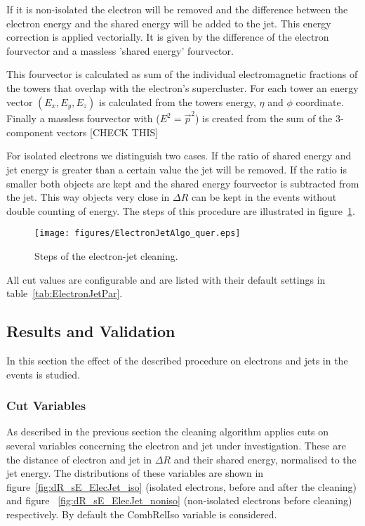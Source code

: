\documentclass{cmspaper}
\begin{document}
If it is non-isolated the electron will be removed and the difference between
the electron energy and the shared energy will be added to the jet. This energy
correction is applied vectorially. It is given by the difference of the electron
fourvector and a massless 'shared energy' fourvector.

{\color{red}This fourvector is calculated as sum of the individual electromagnetic
fractions of the towers that overlap with the electron's supercluster. For each
tower an energy vector $(E_x, E_y, E_z)$ is calculated from the towers energy,
$\eta$ and $\phi$ coordinate. Finally a massless fourvector with
($E^2=\vec{p}^2$) is created from the sum of the 3-component vectors [CHECK
THIS]}

For isolated electrons we distinguish two cases. If the ratio of shared energy
and jet energy is greater than a certain value the jet will be removed. If the
ratio is smaller both objects are kept and the shared energy fourvector is subtracted from
the jet. This way objects very close in $\Delta R$ can be kept in the events
without double counting of energy.
The steps of this procedure are illustrated in figure~\ref{fig:EJCleaning}.

\begin{figure}[hbtp]
  \begin{center}
    \texttt{[image: figures/ElectronJetAlgo\_quer.eps]}
    \caption{Steps of the electron-jet cleaning.}
    \label{fig:EJCleaning}
  \end{center}
\end{figure}

All cut values are configurable and are listed with their default settings in
table~\ref{tab:ElectronJetPar}.

\subsection{Results and Validation}
In this section the effect of the described procedure on electrons and jets in
the events is studied. 

\subsubsection{Cut Variables}
As described in the previous section the cleaning algorithm applies cuts on
several variables concerning the electron and jet under investigation. These are
the distance of electron and jet in $\Delta R$ and their shared energy,
normalised to the jet energy. The distributions of these variables are shown
in figure~\ref{fig:dR_sE_ElecJet_iso} (isolated electrons, before and after the
cleaning) and figure ~\ref{fig:dR_sE_ElecJet_noniso} (non-isolated electrons
before cleaning) respectively. By default the CombRelIso variable is considered.
\end{document}
